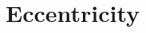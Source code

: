 \hypertarget{group___e_g_x_math-_geometry-_eccentricity}{}\section{Eccentricity}
\label{group___e_g_x_math-_geometry-_eccentricity}
